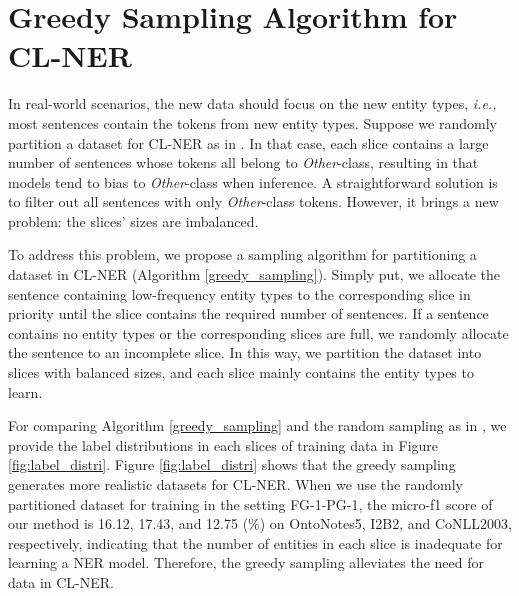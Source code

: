 \documentclass[11pt]{article}
\begin{document}
\section{Greedy Sampling Algorithm for CL-NER\label{appendix:greedy_algorithm}}

In real-world scenarios, the new data should focus on the new entity types, \textit{i.e., } most sentences contain the tokens from new entity types.
Suppose we randomly partition a dataset for CL-NER as in \citet{monaikul2021continual}. 
In that case, each slice contains a large number of sentences whose tokens all belong to \textit{Other}-class, resulting in that models tend to bias to \textit{Other}-class when inference.
A straightforward solution is to filter out all sentences with only \textit{Other}-class tokens.
However, it brings a new problem: the slices' sizes are imbalanced.

To address this problem, we propose a sampling algorithm for partitioning a dataset in CL-NER (Algorithm \ref{greedy_sampling}).
Simply put, we allocate the sentence containing low-frequency entity types to the corresponding slice in priority until the slice contains the required number of sentences.
If a sentence contains no entity types or the corresponding slices are full, we randomly allocate the sentence to an incomplete slice.
In this way, we partition the dataset into slices with balanced sizes, and each slice mainly contains the entity types to learn.

For comparing Algorithm \ref{greedy_sampling} and the random sampling as in \citet{monaikul2021continual}, we provide the label distributions in each slices of training data in Figure \ref{fig:label_distri}.
Figure \ref{fig:label_distri} shows that the greedy sampling generates more realistic datasets for CL-NER.
When we use the randomly partitioned dataset for training in the setting FG-1-PG-1, the micro-f1 score of our method is 16.12, 17.43, and 12.75 (\%) on OntoNotes5, I2B2, and CoNLL2003, respectively, indicating that the number of entities in each slice is inadequate for learning a NER model.
Therefore, the greedy sampling alleviates the need for data in CL-NER.
\end{document}
